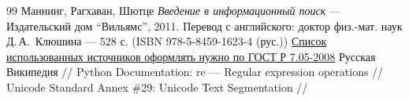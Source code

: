 \begin{thebibliography}{99}
Маннинг, Рагхаван, Шютце
{\itshape Введение в информационный поиск} --- Издательский дом \enquote{Вильямс}, 2011. Перевод с английского: доктор физ.-мат. наук Д.\,А.\, Клюшина --- 528 с. (ISBN 978-5-8459-1623-4 (рус.))
\href{http://www.ifap.ru/library/gost/7052008.pdf}{Список использованных источников оформлять нужно по  ГОСТ Р 7.05-2008}
Русская Википедия // 
Python Documentation: re --- Regular expression operations // 
Unicode Standard Annex \#29: Unicode Text Segmentation // 
\end{thebibliography}
